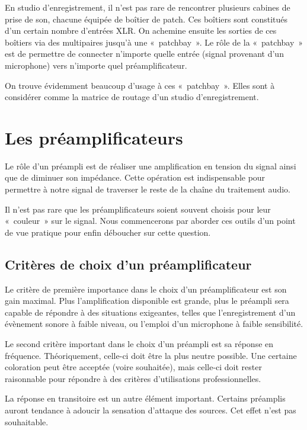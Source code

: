 \documentclass[
]{book}
\begin{document}
En studio d'enregistrement, il n'est pas rare de rencontrer plusieurs cabines de prise de son, chacune équipée de boîtier de patch. Ces boîtiers sont constitués d'un certain nombre d'entrées XLR. On achemine ensuite les sorties de ces boîtiers via des multipaires jusqu'à une «~patchbay~». Le rôle de la «~patchbay~» est de permettre de connecter n'importe quelle entrée (signal provenant d'un microphone) vers n'importe quel préamplificateur.

On trouve évidemment beaucoup d'usage à ces «~patchbay~». Elles sont à considérer comme la matrice de routage d'un studio d'enregistrement.

\hypertarget{les-pruxe9amplificateurs}{%
\chapter{Les préamplificateurs}\label{les-pruxe9amplificateurs}}

Le rôle d'un préampli est de réaliser une amplification en tension du signal ainsi que de diminuer son impédance. Cette opération est indispensable pour permettre à notre signal de traverser le reste de la chaîne du traitement audio.

Il n'est pas rare que les préamplificateurs soient souvent choisis pour leur «~couleur~» sur le signal. Nous commencerons par aborder ces outils d'un point de vue pratique pour enfin déboucher sur cette question.

\hypertarget{crituxe8res-de-choix-dun-pruxe9amplificateur}{%
\section{Critères de choix d'un préamplificateur}\label{crituxe8res-de-choix-dun-pruxe9amplificateur}}

Le critère de première importance dans le choix d'un préamplificateur est son gain maximal. Plus l'amplification disponible est grande, plus le préampli sera capable de répondre à des situations exigeantes, telles que l'enregistrement d'un évènement sonore à faible niveau, ou l'emploi d'un microphone à faible sensibilité.

Le second critère important dans le choix d'un préampli est sa réponse en fréquence. Théoriquement, celle-ci doit être la plus neutre possible. Une certaine coloration peut être acceptée (voire souhaitée), mais celle-ci doit rester raisonnable pour répondre à des critères d'utilisations professionnelles.

La réponse en transitoire est un autre élément important. Certains préamplis auront tendance à adoucir la sensation d'attaque des sources. Cet effet n'est pas souhaitable.
\end{document}
